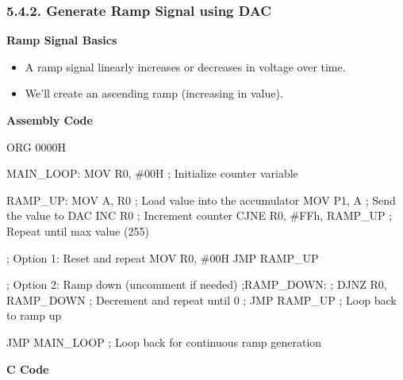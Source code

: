 \documentclass[
]{article}
\newenvironment{Shaded}{}{}
\newcommand{\NormalTok}[1]{#1}
\begin{document}
\hypertarget{542-generate-ramp-signal-using-dac}{%
\subsubsection{5.4.2. Generate Ramp Signal using
DAC}\label{542-generate-ramp-signal-using-dac}}

\textbf{Ramp Signal Basics}

\begin{itemize}
\item
  A ramp signal linearly increases or decreases in voltage over time.
\item
  We'll create an ascending ramp (increasing in value).
\end{itemize}

\textbf{Assembly Code}

\begin{Shaded}
\begin{Highlighting}[]
\NormalTok{ORG 0000H}

\NormalTok{MAIN\_LOOP:}
\NormalTok{    MOV R0, \#00H  ; Initialize counter variable}

\NormalTok{RAMP\_UP:}
\NormalTok{    MOV A, R0     ; Load value into the accumulator}
\NormalTok{    MOV P1, A     ; Send the value to DAC}
\NormalTok{    INC R0        ; Increment counter}
\NormalTok{    CJNE R0, \#FFh, RAMP\_UP  ; Repeat until max value (255)}

\NormalTok{    ; Option 1: Reset and repeat}
\NormalTok{    MOV R0, \#00H}
\NormalTok{    JMP RAMP\_UP}

\NormalTok{    ; Option 2: Ramp down (uncomment if needed)}
\NormalTok{    ;RAMP\_DOWN:}
\NormalTok{    ;    DJNZ R0, RAMP\_DOWN  ; Decrement and repeat until 0}
\NormalTok{    ;    JMP RAMP\_UP         ; Loop back to ramp up}

\NormalTok{    JMP MAIN\_LOOP  ; Loop back for continuous ramp generation}
\end{Highlighting}
\end{Shaded}

\textbf{C Code}
\end{document}
